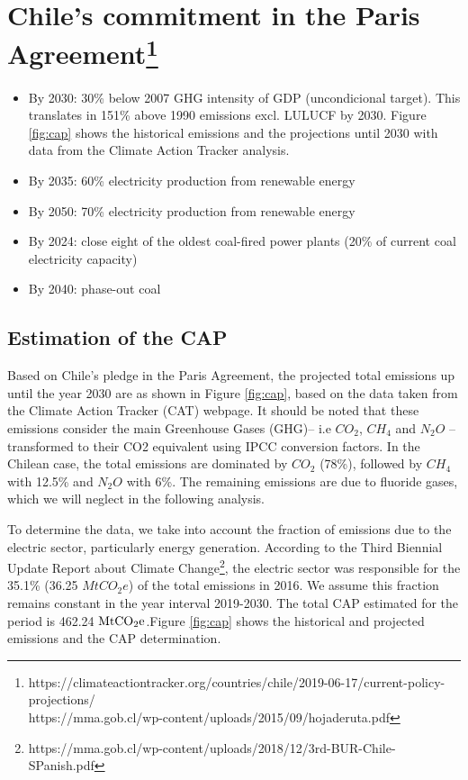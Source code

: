 \documentclass[11pt, letterpaper]{article}
\begin{document}
\section{Chile's commitment in the Paris Agreement\footnote{https://climateactiontracker.org/countries/chile/2019-06-17/current-policy-projections/ \\https://mma.gob.cl/wp-content/uploads/2015/09/hojaderuta.pdf} }

\begin{itemize}
    \item By 2030: 30\% below 2007 GHG intensity of GDP (uncondicional target). This translates in 151\% above 1990 emissions excl. LULUCF by 2030. Figure \ref{fig:cap} shows the historical emissions and the projections until 2030 with data from the Climate Action Tracker analysis.
    \item By 2035: 60\% electricity production from renewable energy 
    \item By 2050: 70\% electricity production from renewable energy
    \item By 2024: close eight of the oldest coal-fired power plants (20\% of current coal electricity capacity) 
    \item By 2040: phase-out coal 
\end{itemize}



\subsection{Estimation of the CAP}
Based on Chile's pledge in the Paris Agreement, the projected total emissions up until the year 2030 are as shown in Figure \ref{fig:cap}, based on the data taken from the Climate Action Tracker (CAT) webpage. It should be noted that these emissions consider the main Greenhouse Gases (GHG)-- i.e $CO_2$, $CH_4$ and $N_2O$ -- transformed to their CO2 equivalent using IPCC conversion factors. In the Chilean case, the total emissions are dominated by $CO_2$ (78\%), followed by $CH_4$ with 12.5\% and $N_2O$  with 6\%. The remaining emissions are due to fluoride gases, which we will neglect in the following analysis. 

To determine the data, we take into account the fraction of emissions due to the electric sector, particularly energy generation. According to the Third Biennial Update Report about Climate Change\footnote{https://mma.gob.cl/wp-content/uploads/2018/12/3rd-BUR-Chile-SPanish.pdf}, the electric sector was responsible for the 35.1\% (36.25 $MtCO_2 e$) of the total emissions in 2016. We assume this fraction remains constant in the year interval 2019-2030. The total CAP estimated for the period is 462.24 $\rm  M t CO_2 e$.Figure \ref{fig:cap} shows the historical and projected emissions and the CAP determination. 
\end{document}
